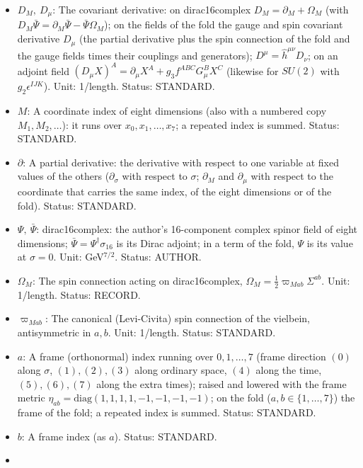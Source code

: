 \documentclass[
  10pt,
]{article}
\providecommand{\tightlist}{%
  \setlength{\itemsep}{0pt}\setlength{\parskip}{0pt}}
\begin{document}
\begin{itemize}
\tightlist
\item
  \(D_M,\ D_\mu\): The covariant derivative: on dirac16complex
  \(D_M = \partial_M + \Omega_M\) (with
  \(D_M\bar\Psi = \partial_M\bar\Psi - \bar\Psi\Omega_M\)); on the
  fields of the fold the gauge and spin covariant derivative \(D_\mu\)
  (the partial derivative plus the spin connection of the fold and the
  gauge fields times their couplings and generators);
  \(D^\mu = \hat h^{\mu\nu}D_\nu\); on an adjoint field
  \((D_\mu X)^A = \partial_\mu X^A + g_3f^{ABC}G^B_\mu X^C\) (likewise
  for \(SU(2)\) with \(g_2\epsilon^{IJK}\)). Unit: 1/length. Status:
  STANDARD.
\item
  \(M\): A coordinate index of eight dimensions (also with a numbered
  copy \(M_1, M_2, \dots\)): it runs over \(x_0, x_1, \dots, x_7\); a
  repeated index is summed. Status: STANDARD.
\item
  \(\partial\): A partial derivative: the derivative with respect to one
  variable at fixed values of the others (\(\partial_\sigma\) with
  respect to \(\sigma\); \(\partial_M\) and \(\partial_\mu\) with
  respect to the coordinate that carries the same index, of the eight
  dimensions or of the fold). Status: STANDARD.
\item
  \(\Psi,\ \bar\Psi\): dirac16complex: the author's 16-component complex
  spinor field of eight dimensions;
  \(\bar\Psi = \Psi^\dagger\sigma_{16}\) is its Dirac adjoint; in a term
  of the fold, \(\Psi\) is its value at \(\sigma = 0\). Unit:
  GeV\(^{7/2}\). Status: AUTHOR.
\item
  \(\Omega_M\): The spin connection acting on dirac16complex,
  \(\Omega_M = \frac12\varpi_{Mab}\Sigma^{ab}\). Unit: 1/length. Status:
  RECORD.
\item
  \(\varpi_{Mab}\): The canonical (Levi-Civita) spin connection of the
  vielbein, antisymmetric in \(a, b\). Unit: 1/length. Status: STANDARD.
\item
  \(a\): A frame (orthonormal) index running over \(0, 1, \dots, 7\)
  (frame direction \((0)\) along \(\sigma\), \((1), (2), (3)\) along
  ordinary space, \((4)\) along the time, \((5), (6), (7)\) along the
  extra times); raised and lowered with the frame metric
  \(\eta_{ab} = \mathrm{diag}(1, 1, 1, 1, -1, -1, -1, -1)\); on the fold
  (\(a, b \in \{1, \dots, 7\}\)) the frame of the fold; a repeated index
  is summed. Status: STANDARD.
\item
  \(b\): A frame index (as \(a\)). Status: STANDARD.
\item

\end{itemize}
\end{document}
